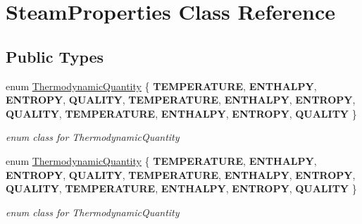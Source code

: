\hypertarget{class_steam_properties}{}\section{Steam\+Properties Class Reference}
\label{class_steam_properties}
\subsection*{Public Types}
\begin{DoxyCompactItemize}
\item 
\mbox{\label{class_steam_properties_ae0294bedf7d178c2d8fb6aed0f62fbff}} 
enum \hyperlink{class_steam_properties_ae0294bedf7d178c2d8fb6aed0f62fbff}{Thermodynamic\+Quantity} \{ \newline
{\bfseries T\+E\+M\+P\+E\+R\+A\+T\+U\+RE}, 
{\bfseries E\+N\+T\+H\+A\+L\+PY}, 
{\bfseries E\+N\+T\+R\+O\+PY}, 
{\bfseries Q\+U\+A\+L\+I\+TY}, 
\newline
{\bfseries T\+E\+M\+P\+E\+R\+A\+T\+U\+RE}, 
{\bfseries E\+N\+T\+H\+A\+L\+PY}, 
{\bfseries E\+N\+T\+R\+O\+PY}, 
{\bfseries Q\+U\+A\+L\+I\+TY}, 
\newline
{\bfseries T\+E\+M\+P\+E\+R\+A\+T\+U\+RE}, 
{\bfseries E\+N\+T\+H\+A\+L\+PY}, 
{\bfseries E\+N\+T\+R\+O\+PY}, 
{\bfseries Q\+U\+A\+L\+I\+TY}
 \}\begin{DoxyCompactList}\small\item\em enum class for Thermodynamic\+Quantity \end{DoxyCompactList}
\item 
\mbox{\label{class_steam_properties_ae0294bedf7d178c2d8fb6aed0f62fbff}} 
enum \hyperlink{class_steam_properties_ae0294bedf7d178c2d8fb6aed0f62fbff}{Thermodynamic\+Quantity} \{ \newline
{\bfseries T\+E\+M\+P\+E\+R\+A\+T\+U\+RE}, 
{\bfseries E\+N\+T\+H\+A\+L\+PY}, 
{\bfseries E\+N\+T\+R\+O\+PY}, 
{\bfseries Q\+U\+A\+L\+I\+TY}, 
\newline
{\bfseries T\+E\+M\+P\+E\+R\+A\+T\+U\+RE}, 
{\bfseries E\+N\+T\+H\+A\+L\+PY}, 
{\bfseries E\+N\+T\+R\+O\+PY}, 
{\bfseries Q\+U\+A\+L\+I\+TY}, 
\newline
{\bfseries T\+E\+M\+P\+E\+R\+A\+T\+U\+RE}, 
{\bfseries E\+N\+T\+H\+A\+L\+PY}, 
{\bfseries E\+N\+T\+R\+O\+PY}, 
{\bfseries Q\+U\+A\+L\+I\+TY}
 \}\begin{DoxyCompactList}\small\item\em enum class for Thermodynamic\+Quantity \end{DoxyCompactList}

\end{DoxyCompactItemize}
